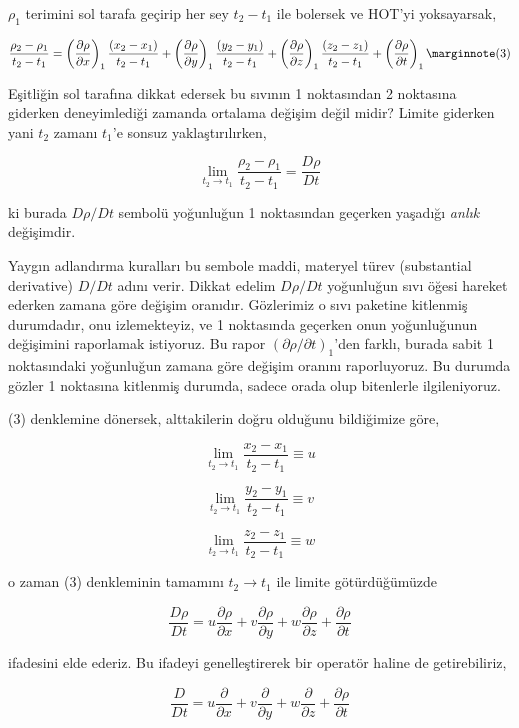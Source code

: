 \documentclass[12pt,fleqn]{article}\usepackage{../../common}
\begin{document}
$\rho_1$ terimini sol tarafa geçirip her sey $t_2-t_1$ ile bolersek ve
HOT'yi yoksayarsak,

$$
\frac{\rho_2-\rho_1}{t_2-t_1} =
\left( \frac{\partial \rho}{\partial x}  \right)_1 \frac{(x_2-x_1)}{t_2-t_1} +
\left( \frac{\partial \rho}{\partial y}  \right)_1 \frac{(y_2-y_1)}{t_2-t_1} +
\left( \frac{\partial \rho}{\partial z}  \right)_1 \frac{(z_2-z_1)}{t_2-t_1} +
\left( \frac{\partial \rho}{\partial t}  \right)_1
\mlabel{3}
$$

Eşitliğin sol tarafına dikkat edersek bu sıvının 1 noktasından 2 noktasına
giderken deneyimlediği zamanda ortalama değişim değil midir? Limite giderken
yani $t_2$ zamanı $t_1$'e sonsuz yaklaştırılırken,

$$
\lim_{t_2 \to t_1} \frac{\rho_2-\rho_1}{t_2-t_1} = \frac{D\rho}{D t}
$$

ki burada $D\rho/D t$ sembolü yoğunluğun 1 noktasından geçerken yaşadığı
{\em anlık} değişimdir.

Yaygın adlandırma kuralları bu sembole maddi, materyel türev (substantial
derivative) $D/Dt$ adını verir. Dikkat edelim $D\rho/Dt$ yoğunluğun sıvı öğesi
hareket ederken zamana göre değişim oranıdır. Gözlerimiz o sıvı paketine
kitlenmiş durumdadır, onu izlemekteyiz, ve 1 noktasında geçerken onun
yoğunluğunun değişimini raporlamak istiyoruz. Bu rapor
$(\partial \rho / \partial t)_1$'den farklı, burada sabit 1 noktasındaki
yoğunluğun zamana göre değişim oranını raporluyoruz. Bu durumda gözler 1
noktasına kitlenmiş durumda, sadece orada olup bitenlerle ilgileniyoruz. 

(3) denklemine dönersek, alttakilerin doğru olduğunu bildiğimize göre,

$$
\lim_{t_2 \to t_1} \frac{x_2 - x_1}{t_2 - t_1} \equiv u
$$

$$
\lim_{t_2 \to t_1} \frac{y_2 - y_1}{t_2 - t_1} \equiv v
$$

$$
\lim_{t_2 \to t_1} \frac{z_2 - z_1}{t_2 - t_1} \equiv w
$$

o zaman (3) denkleminin tamamını $t_2 \to t_1$ ile limite götürdüğümüzde

$$
\frac{D\rho}{D t} =
u \frac{\partial \rho}{\partial x} + 
v \frac{\partial \rho}{\partial y} + 
w \frac{\partial \rho}{\partial z} + 
\frac{\partial \rho}{\partial t} 
$$

ifadesini elde ederiz. Bu ifadeyi genelleştirerek bir operatör haline de
getirebiliriz,

$$
\frac{D}{D t} =
u \frac{\partial }{\partial x} + 
v \frac{\partial }{\partial y} + 
w \frac{\partial }{\partial z} + 
\frac{\partial \rho}{\partial t} 
$$
\end{document}
